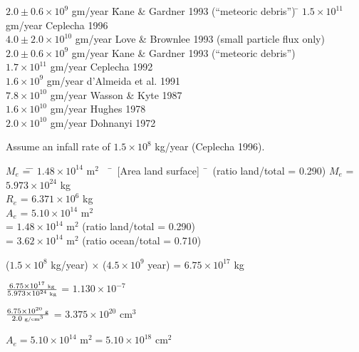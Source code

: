 



\begin{tabbing}
$2.0 \pm 0.6 \times 10^9$ gm/year \hspace*{0.5in}  \= Kane \& Gardner 1993
					 (``meteoric debris'') \= \kill
$1.5 \times 10^{11}$ gm/year \> Ceplecha 1996 \\
$4.0 \pm 2.0 \times 10^{10}$ gm/year \> Love \& Brownlee 1993 
					     (small particle flux only) \\
$2.0 \pm 0.6 \times 10^9$ gm/year \> Kane \& Gardner 1993
					 (``meteoric debris'') \\
$1.7 \times 10^{11}$ gm/year \> Ceplecha 1992 \\
$1.6 \times 10^9$ gm/year  \>        d'Almeida et al. 1991 \\
$7.8 \times 10^{10}$ gm/year  \>        Wasson \& Kyte 1987 \\
$1.6 \times 10^{10}$ gm/year  \>        Hughes 1978 \\
$2.0 \times 10^{10}$ gm/year  \>        Dohnanyi 1972 \\
\end{tabbing}

\noindent
Assume an infall rate of $1.5 \times 10^{8}$ kg/year (Ceplecha 1996).
\begin{tabbing}
$M_e$ \= = \= $1.48 \times 10^{14}$ m$^2$ \ \= \ \ [Area land surface] 
\= \ \ (ratio land/total = 0.290)\kill
$M_e$ \> = \> $5.973 \times 10^{24}$ kg  \\
$R_e$ \> = \> $6.371 \times 10^6$ kg     \\
$A_e$ \> = \> $5.10 \times 10^{14}$ m$^2$  \\
      \> = \> $1.48 \times 10^{14}$ m$^2$  \> (ratio land/total = 0.290)\\
      \> = \> $3.62 \times 10^{14}$ m$^2$  \> (ratio ocean/total = 0.710) \\
\end{tabbing}

\bigskip
\noindent
($1.5 \times 10^8$ kg/year) $\times$ ($4.5 \times 10^9$ year) = 
$6.75 \times 10^{17}$ kg

\bigskip
\noindent
${{6.75 \times 10^{17} \mbox{\tiny \  kg}} 
\over {5.973 \times 10^{24} \mbox{\tiny \  kg}}}$
= $1.130 \times 10^{-7}$

\bigskip
\noindent
${{6.75 \times 10^{20} \mbox{\tiny \ g}} \over {2.0 \mbox{\tiny \  g/cm}^3}}$
= $3.375 \times 10^{20}$ cm$^3$

\bigskip
\noindent
$A_e = 5.10 \times 10^{14} \mbox{\ m}^2 = 5.10 \times 10^{18} \mbox{\ cm}^2$



